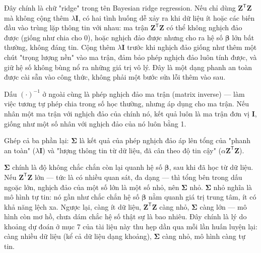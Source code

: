 \documentclass[12pt]{article}
\begin{document}
Đây chính là chữ "ridge" trong tên Bayesian ridge regression. Nếu chỉ dùng $\boldsymbol{Z}^{\mathsf{T}}\boldsymbol{Z}$ mà không cộng thêm $\lambda\boldsymbol{I}$, có hai tình huống dễ xảy ra khi dữ liệu ít hoặc các biến đầu vào trùng lặp thông tin với nhau: ma trận $\boldsymbol{Z}^{\mathsf{T}}\boldsymbol{Z}$ có thể không nghịch đảo được (giống như chia cho 0), hoặc nghịch đảo được nhưng cho ra hệ số $\boldsymbol{\beta}$ lớn bất thường, không đáng tin. Cộng thêm $\lambda\boldsymbol{I}$ trước khi nghịch đảo giống như thêm một chút "trọng lượng nền" vào ma trận, đảm bảo phép nghịch đảo luôn tính được, và giữ hệ số không bùng nổ ra những giá trị vô lý. Đây là một dạng phanh an toàn được cài sẵn vào công thức, không phải một bước sửa lỗi thêm vào sau.

Dấu $(\cdot)^{-1}$ ở ngoài cùng là phép nghịch đảo ma trận (matrix inverse) — làm việc tương tự phép chia trong số học thường, nhưng áp dụng cho ma trận. Nếu nhân một ma trận với nghịch đảo của chính nó, kết quả luôn là ma trận đơn vị $\boldsymbol{I}$, giống như một số nhân với nghịch đảo của nó luôn bằng 1.

Ghép cả ba phần lại: $\boldsymbol{\Sigma}$ là kết quả của phép nghịch đảo áp lên tổng của "phanh an toàn" ($\lambda\boldsymbol{I}$) và "lượng thông tin từ dữ liệu, đã cân theo độ tin cậy" ($\alpha\boldsymbol{Z}^{\mathsf{T}}\boldsymbol{Z}$).

$\boldsymbol{\Sigma}$ chính là độ không chắc chắn còn lại quanh hệ số $\boldsymbol{\beta}$, sau khi đã học từ dữ liệu. Nếu $\boldsymbol{Z}^{\mathsf{T}}\boldsymbol{Z}$ lớn — tức là có nhiều quan sát, đa dạng — thì tổng bên trong dấu ngoặc lớn, nghịch đảo của một số lớn là một số nhỏ, nên $\boldsymbol{\Sigma}$ nhỏ. $\boldsymbol{\Sigma}$ nhỏ nghĩa là mô hình tự tin: nó gần như chắc chắn hệ số $\boldsymbol{\beta}$ nằm quanh giá trị trung tâm, ít có khả năng lệch xa. Ngược lại, càng ít dữ liệu, $\boldsymbol{Z}^{\mathsf{T}}\boldsymbol{Z}$ càng nhỏ, $\boldsymbol{\Sigma}$ càng lớn — mô hình còn mơ hồ, chưa dám chắc hệ số thật sự là bao nhiêu. Đây chính là lý do khoảng dự đoán ở mục 7 của tài liệu này thu hẹp dần qua mỗi lần huấn luyện lại: càng nhiều dữ liệu (kể cả dữ liệu dạng khoảng), $\boldsymbol{\Sigma}$ càng nhỏ, mô hình càng tự tin.
\end{document}
